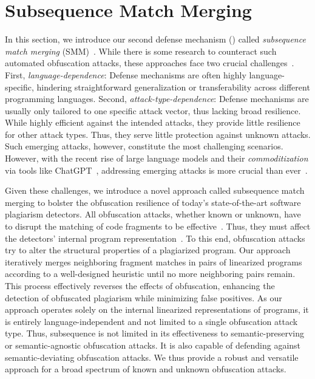 \section{Subsequence Match Merging}\label{sec:smm}
In this section, we introduce our second defense mechanism () called \textit{subsequence match merging} (SMM)~\cite{Saglam2024d}.
While there is some research to counteract such automated obfuscation attacks, these approaches face two crucial challenges~\cite{Saglam2024b}.
First, \textit{language-dependence}: Defense mechanisms are often highly language-specific, hindering straightforward generalization or transferability across different programming languages.
Second, \textit{attack-type-dependence}: Defense mechanisms are usually only tailored to one specific attack vector, thus lacking broad resilience. While highly efficient against the intended attacks, they provide little resilience for other attack types.
Thus, they serve little protection against unknown attacks. Such emerging attacks, however, constitute the most challenging scenarios.
However, with the recent rise of large language models and their \textit{commoditization} via tools like ChatGPT~\cite{ChatGPT}, addressing emerging attacks is more crucial than ever~\cite{ChatGPTGuide}. 

Given these challenges, we introduce a novel approach called subsequence match merging to bolster the obfuscation resilience of today's state-of-the-art software plagiarism detectors.
%
All obfuscation attacks, whether known or unknown, have to disrupt the matching of code fragments to be effective~\cite{DevoreMcDonald2020}. Thus, they must affect the detectors' internal program representation~\cite{Saglam2024b}.
%
To this end, obfuscation attacks try to alter the structural properties of a plagiarized program.
%
Our approach iteratively merges neighboring fragment matches in pairs of linearized programs according to a well-designed heuristic until no more neighboring pairs remain. This process effectively reverses the effects of obfuscation, enhancing the detection of obfuscated plagiarism while minimizing false positives.
%
As our approach operates solely on the internal linearized representations of programs, it is entirely language-independent and not limited to a single obfuscation attack type.
Thus, subsequence is not limited in its effectiveness to semantic-preserving or semantic-agnostic obfuscation attacks.
It is also capable of defending against semantic-deviating obfuscation attacks.
We thus provide a robust and versatile approach for a broad spectrum of known and unknown obfuscation attacks.

